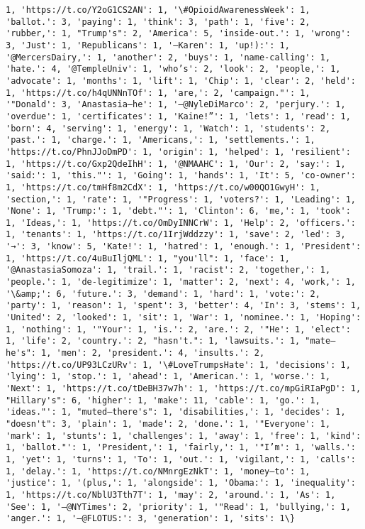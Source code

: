 \documentclass[11pt]{article}
\begin{document}
\begin{Verbatim}[commandchars=\\\{\}]
1, 'https://t.co/Y2oG1CS2AN': 1, '\#OpioidAwarenessWeek': 1, 'ballot.': 3, 'paying': 1, 'think': 3, 'path': 1, 'five': 2, 'rubber,': 1, "Trump's": 2, 'America': 5, 'inside-out.': 1, 'wrong': 3, 'Just': 1, 'Republicans': 1, '—Karen': 1, 'up!):': 1, '@MercersDairy,': 1, 'another': 2, 'buys': 1, 'name-calling': 1, 'hate.': 4, '@TempleUniv': 1, 'who’s': 2, 'look': 2, 'people,': 1, 'advocate': 1, 'months': 1, 'lift': 1, 'Chip': 1, 'clear': 2, 'held': 1, 'https://t.co/h4qUNNnTOf': 1, 'are,': 2, 'campaign."': 1, '"Donald': 3, 'Anastasia—he': 1, '—@NyleDiMarco': 2, 'perjury.': 1, 'overdue': 1, 'certificates': 1, 'Kaine!”': 1, 'lets': 1, 'read': 1, 'born': 4, 'serving': 1, 'energy': 1, 'Watch': 1, 'students': 2, 'past.': 1, 'charge.': 1, 'Americans,': 1, 'settlements.': 1, 'https://t.co/PhnJJoDmPD': 1, 'origin': 1, 'helped': 1, 'resilient': 1, 'https://t.co/Gxp2QdeIhH': 1, '@NMAAHC': 1, 'Our': 2, 'say:': 1, 'said:': 1, 'this."': 1, 'Going': 1, 'hands': 1, 'It': 5, 'co-owner': 1, 'https://t.co/tmHf8m2CdX': 1, 'https://t.co/w00QO1GwyH': 1, 'section,': 1, 'rate': 1, '"Progress': 1, 'voters?': 1, 'Leading': 1, 'None': 1, 'Trump:': 1, 'debt."': 1, 'Clinton': 6, 'me,': 1, 'took': 1, 'Ideas,': 1, 'https://t.co/OmDyINNCrW': 1, 'Help': 2, 'officers.': 1, 'tenants': 1, 'https://t.co/1IrjWddzzy': 1, 'save': 2, 'led': 3, '→': 3, 'know': 5, 'Kate!': 1, 'hatred': 1, 'enough.': 1, 'President': 1, 'https://t.co/4uBuIljQML': 1, "you'll": 1, 'face': 1, '@AnastasiaSomoza': 1, 'trail.': 1, 'racist': 2, 'together,': 1, 'people.': 1, 'de-legitimize': 1, 'matter': 2, 'next': 4, 'work,': 1, '\&amp;': 6, 'future.': 3, 'demand': 1, 'hard': 1, 'vote:': 2, 'party': 1, 'reason': 1, 'spent': 3, 'better': 4, 'In': 3, 'stems': 1, 'United': 2, 'looked': 1, 'sit': 1, 'War': 1, 'nominee.': 1, 'Hoping': 1, 'nothing': 1, '"Your': 1, 'is.': 2, 'are.': 2, '"He': 1, 'elect': 1, 'life': 2, 'country.': 2, "hasn't.": 1, 'lawsuits.': 1, "mate—he's": 1, 'men': 2, 'president.': 4, 'insults.': 2, 'https://t.co/UP93LCzURv': 1, '\#LoveTrumpsHate': 1, 'decisions': 1, 'lying': 1, 'stop.': 1, 'ahead': 1, 'American.': 1, 'worse.': 1, 'Next': 1, 'https://t.co/tDeBH37w7h': 1, 'https://t.co/mpGiRIaPgD': 1, "Hillary's": 6, 'higher': 1, 'make': 11, 'cable': 1, 'go.': 1, 'ideas."': 1, "muted—there's": 1, 'disabilities,': 1, 'decides': 1, "doesn't": 3, 'plain': 1, 'made': 2, 'done.': 1, '"Everyone': 1, 'mark': 1, 'stunts': 1, 'challenges': 1, 'away': 1, 'free': 1, 'kind': 1, 'ballot."': 1, 'President,': 1, 'fairly,': 1, '"I’m': 1, 'walls.': 1, 'yet': 1, 'turns': 1, 'To': 1, 'out.': 1, 'vigilant,': 1, 'calls': 1, 'delay.': 1, 'https://t.co/NMnrgEzNkT': 1, 'money—to': 1, 'justice': 1, '(plus,': 1, 'alongside': 1, 'Obama:': 1, 'inequality': 1, 'https://t.co/NblU3Tth7T': 1, 'may': 2, 'around.': 1, 'As': 1, 'See': 1, '—@NYTimes': 2, 'priority': 1, '"Read': 1, 'bullying,': 1, 'anger.': 1, '—@FLOTUS:': 3, 'generation': 1, 'sits': 1\}

    \end{Verbatim}
\end{document}
